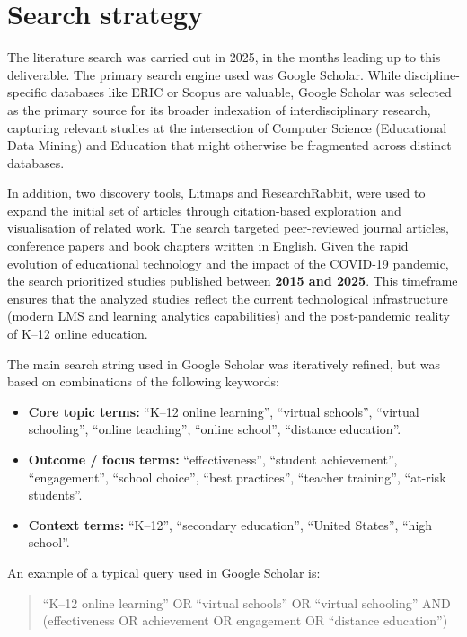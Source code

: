 \section{Search strategy}
\label{sec:search-strategy}
The literature search was carried out in 2025, in the months leading up to this deliverable.
The primary search engine used was Google Scholar. While discipline-specific databases like ERIC or Scopus are valuable, Google Scholar was selected as the primary source for its broader indexation of interdisciplinary research, capturing relevant studies at the intersection of Computer Science (Educational Data Mining) and Education that might otherwise be fragmented across distinct databases.

In addition, two discovery tools, Litmaps and ResearchRabbit, were used to expand the initial set of articles through citation-based exploration and visualisation of related work.
The search targeted peer-reviewed journal articles, conference papers and book chapters written in English.
Given the rapid evolution of educational technology and the impact of the COVID-19 pandemic, the search prioritized studies published between \textbf{2015 and 2025}.
This timeframe ensures that the analyzed studies reflect the current technological infrastructure (modern LMS and learning analytics capabilities) and the post-pandemic reality of K--12 online education.

The main search string used in Google Scholar was iteratively refined, but was based on combinations of the following keywords:
\begin{itemize}
    \item \textbf{Core topic terms:} ``K--12 online learning'', ``virtual schools'', ``virtual schooling'', ``online teaching'', ``online school'', ``distance education''.
    \item \textbf{Outcome / focus terms:} ``effectiveness'', ``student achievement'', ``engagement'', ``school choice'', ``best practices'', ``teacher training'', ``at-risk students''.
    \item \textbf{Context terms:} ``K--12'', ``secondary education'', ``United States'', ``high school''.
\end{itemize}

An example of a typical query used in Google Scholar is:
\begin{quote}
``K--12 online learning'' OR ``virtual schools'' OR ``virtual schooling'' AND (effectiveness OR achievement OR engagement OR ``distance education'')
\end{quote}

